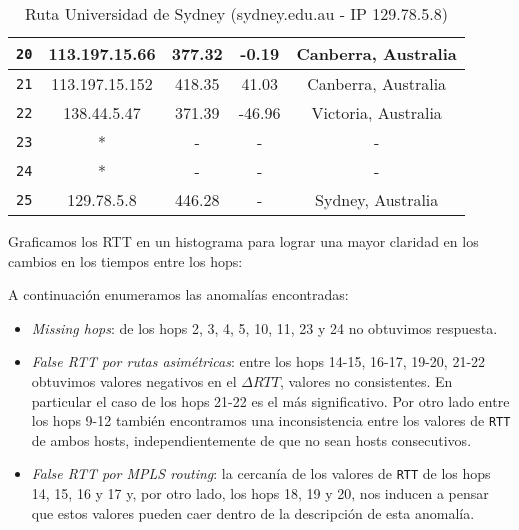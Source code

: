\begin{table}[ht]
\begin{center}
\begin{tabular}{|c|c|c|c|c|}
    \texttt{20} & 113.197.15.66   & 377.32  & -0.19   & Canberra, Australia   \\ \hline
    \texttt{21} & 113.197.15.152  & 418.35  & 41.03   & Canberra, Australia    \\ \hline
    \texttt{22} & 138.44.5.47     & 371.39  & -46.96  & Victoria, Australia   \\ \hline
    \texttt{23} & *               & -       & -       & -                \\ \hline
    \texttt{24} & *               & -       & -       & -   \\ \hline
    \texttt{25} & 129.78.5.8      & 446.28  & -       & Sydney, Australia   \\ \hline
    \end{tabular}
    \caption{Ruta Universidad de Sydney (sydney.edu.au - IP 129.78.5.8)}
\end{center}\end{table}

Graficamos los RTT en un histograma para lograr una mayor claridad en los cambios en los tiempos entre los hops:

\begin{figure}[H]
    \centering
\end{figure}

A continuación enumeramos las anomalías encontradas:
\begin{itemize}
    \item \textit{Missing hops}: de los hops 2, 3, 4, 5, 10, 11, 23 y 24 no obtuvimos respuesta.
    \item \textit{False RTT por rutas asimétricas}: entre los hops 14-15, 16-17, 19-20, 21-22 obtuvimos valores negativos en el $\Delta RTT$, valores no consistentes. En particular el caso de los hops 21-22 es el más significativo. Por otro lado entre los hops 9-12 también encontramos una inconsistencia entre los valores de \texttt{RTT} de ambos hosts, independientemente de que no sean hosts consecutivos.
    \item \textit{False RTT por MPLS routing}: la cercanía de los valores de \texttt{RTT} de los hops 14, 15, 16 y 17 y, por otro lado, los hops 18, 19 y 20, nos inducen a pensar que estos valores pueden caer dentro de la descripción de esta anomalía.
\end{itemize}


